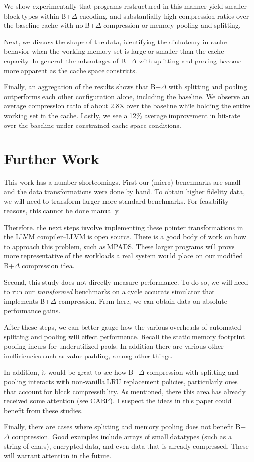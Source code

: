\documentclass[pageno]{jpaper}
\begin{document}
We show experimentally that programs restructured in this manner yield smaller block types within B+$\Delta$ encoding, and substantially high compression ratios over the baseline cache with no B+$\Delta$ compression or memory pooling and splitting.

 Next, we discuss the shape of the data, identifying the dichotomy in cache behavior when the working memory set is large or smaller than the cache capacity. In general, the advantages of B+$\Delta$ with splitting and pooling become more apparent as the cache space constricts.

Finally, an aggregation of the results shows that B+$\Delta$ with splitting and pooling outperforms each other configuration alone, including the baseline. We observe an average compression ratio of about 2.8X over the baseline while holding the entire working set in the cache. Lastly, we see a 12\% average improvement in hit-rate over the baseline under constrained cache space conditions.


\section{Further Work}
This work has a number shortcomings. First our (micro) benchmarks are small and the data transformations were done by hand. To obtain higher fidelity data, we will need to transform larger more standard benchmarks. For feasibility reasons, this cannot be done manually.

Therefore, the next steps involve implementing these pointer transformations in the LLVM compiler--LLVM is open source. There is a good body of work on how to approach this problem, such as MPADS\cite{mpads}. These larger programs will prove more representative of the workloads a real system would place on our modified B+$\Delta$ compression idea.

Second, this study does not directly measure performance. To do so, we will need to run our \textit{transformed} benchmarks on a cycle accurate simulator that implements B+$\Delta$ compression. From here, we can obtain data on absolute performance gains.

After these steps, we can better gauge how the various overheads of automated splitting and pooling will affect performance. Recall the static memory footprint pooling incurs for underutilized pools. In addition there are various other inefficiencies such as value padding, among other things.

In addition, it would be great to see how B+$\Delta$ compression with splitting and pooling interacts with non-vanilla LRU replacement policies, particularly ones that account for block compressibility. As mentioned, there this area has already received some attention (see CARP\cite{carp}). I suspect the ideas in this paper could benefit  from these studies.

Finally, there are cases where splitting and memory pooling does not benefit B+$\Delta$ compression. Good examples include arrays of small datatypes (such as a string of chars), encrypted data, and even data that is already compressed. These will warrant attention in the future.



\end{document}
